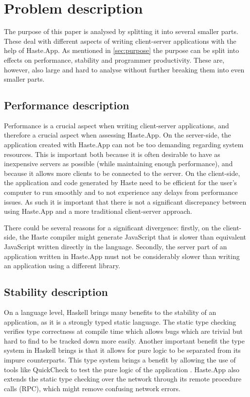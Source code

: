 \documentclass[a4paper]{article}
\begin{document}

\newpage
\section{Problem description}
\label{sec:problem}
The purpose of this paper is analysed by splitting it into several smaller parts. These deal with different aspects of writing client-server applications with the help of Haste.App. As mentioned in \cref{sec:purpose} the purpose can be split into effects on performance, stability and programmer productivity. These are, however, also large and hard to analyse without further breaking them into even smaller parts.


\subsection{Performance description}
\label{sub:performance-description}
Performance is a crucial aspect when writing client-server applications, and therefore a crucial aspect when assessing Haste.App. On the server-side, the application created with Haste.App can not be too demanding regarding system resources. This is important both because it is often desirable to have as inexpensive servers as possible (while maintaining enough performance), and because it allows more clients to be connected to the server. On the client-side, the application and code generated by Haste need to be efficient for the user's computer to run smoothly and to not experience any delays from performance issues. As such it is important that there is not a significant discrepancy between using Haste.App and a more traditional client-server approach. 

There could be several reasons for a significant divergence: firstly, on the client-side, the Haste compiler might generate JavaScript that is slower than equivalent JavaScript written directly in the language. Secondly, the server part of an application written in Haste.App must not be considerably slower than writing an application using a different library. 

\subsection{Stability description}
On a language level, Haskell brings many benefits to the stability of an application, as it is a strongly typed static language. The static type checking verifies type correctness at compile time which allows bugs which are trivial but hard to find to be tracked down more easily. Another important benefit the type system in Haskell brings is that it allows for pure logic to be separated from its impure counterparts. This type system brings a benefit by allowing the use of tools like QuickCheck to test the pure logic of the application \cite{Claessen:2011:QLT:1988042.1988046}. Haste.App also extends the static type checking over the network through its remote procedure calls (RPC), which might remove confusing network errors. 
\end{document}
